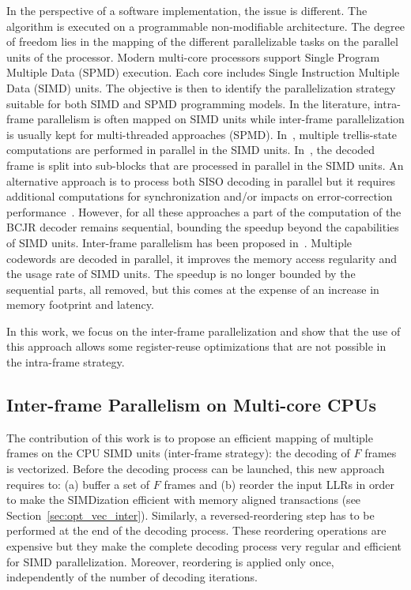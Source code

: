 In the perspective of a software implementation, the issue is different. The
algorithm is executed on a programmable non-modifiable architecture. The degree
of freedom lies in the mapping of the different parallelizable tasks on the
parallel units of the processor. Modern multi-core processors support Single
Program Multiple Data (SPMD) execution. Each core includes Single Instruction
Multiple Data (SIMD) units. The objective is then to identify the
parallelization strategy suitable for both SIMD and SPMD programming models.
In the literature, intra-frame parallelism is often mapped on SIMD units while
inter-frame parallelization is usually kept for multi-threaded approaches
(SPMD). In~\cite{Zhang2012,Wu2013}, multiple trellis-state computations are
performed in parallel in the SIMD units. In~\cite{Wu2010,Wu2011,Chinnici2012,
Yoge2012,Zhang2012,Liu2013,Chen2013,Xianjun2013,Wu2013,Zhang2014,Li2014}, the
decoded frame is split into sub-blocks that are processed in parallel in the
SIMD units. An alternative approach is to process both SISO decoding in parallel
but it requires additional computations for synchronization and/or impacts on
error-correction performance~\cite{Muller2009}. However, for all these
approaches a part of the computation of the BCJR decoder remains sequential,
bounding the speedup beyond the capabilities of SIMD units. Inter-frame
parallelism has been proposed in~\cite{Wu2010,Wu2011,Zhang2012,Wu2013}. Multiple
codewords are decoded in parallel, it improves the memory access regularity and
the usage rate of SIMD units. The speedup is no longer bounded by the sequential
parts, all removed, but this comes at the expense of an increase in memory
footprint and latency.

In this work, we focus on the inter-frame parallelization and show that the use
of this approach allows some register-reuse optimizations that are not possible
in the intra-frame strategy.

\subsection{Inter-frame Parallelism on Multi-core CPUs}

The contribution of this work is to propose an efficient mapping of multiple
frames on the CPU SIMD units (inter-frame strategy): the decoding of $F$ frames
is vectorized. Before the decoding process can be launched, this new approach
requires to: (a) buffer a set of $F$ frames and (b) reorder the input LLRs in
order to make the SIMDization efficient with memory aligned transactions (see
Section~\ref{sec:opt_vec_inter}). Similarly, a reversed-reordering step
has to be performed at the end of the decoding process. These reordering
operations are expensive but they make the complete decoding process very
regular and efficient for SIMD parallelization. Moreover, reordering is applied
only once, independently of the number of decoding iterations.

